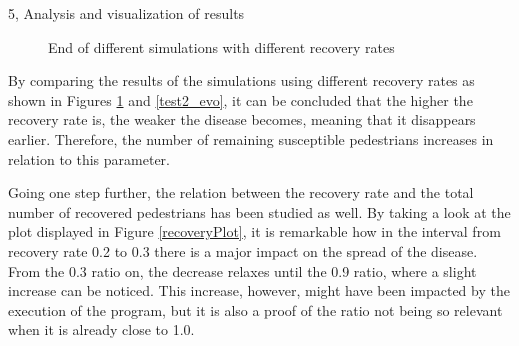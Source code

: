 \documentclass[10pt,a4paper]{article}
\begin{document}
\begin{task}{5, Analysis and visualization of results}
\begin{figure} [H]
 \centering
 \caption{End of different simulations with different recovery rates}
 \label{test2_sim}
\end{figure}

By comparing the results of the simulations using different recovery rates as shown in Figures \ref{test2_sim} and \ref{test2_evo}, it can be concluded that the higher the recovery rate is, the weaker the disease becomes, meaning that it disappears earlier. Therefore, the number of remaining susceptible pedestrians increases in relation to this parameter.

Going one step further, the relation between the recovery rate and the total number of recovered pedestrians has been studied as well. By taking a look at the plot displayed in Figure \ref{recoveryPlot}, it is remarkable how in the interval from recovery rate 0.2 to 0.3 there is a major impact on the spread of the disease. From the 0.3 ratio on, the decrease relaxes until the 0.9 ratio, where a slight increase can be noticed. This increase, however, might have been impacted by the execution of the program, but it is also a proof of the ratio not being so relevant when it is already close to 1.0.


\end{task}
\end{document}
